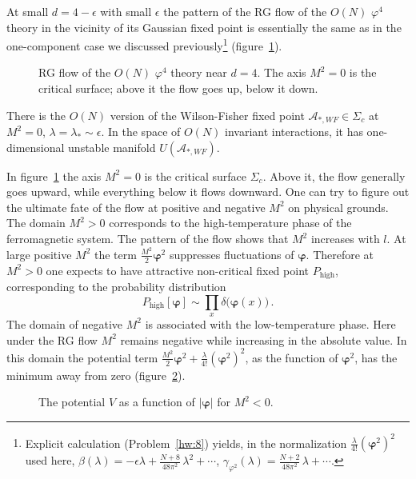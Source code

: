 At small $d=4-\epsilon$ with small $\epsilon$ the pattern of the RG flow of the
$O(N)$ $\varphi^4$ theory in the vicinity of its Gaussian fixed point is
essentially the same as in the one-component case we discussed
previously\footnote{Explicit calculation (Problem~\ref{hw:8}) yields, in the
normalization $\frac\lambda{4!}(\bm{\varphi}^2)^2$ used here,
$\beta(\lambda)=-\epsilon\lambda+\frac{N+8}{48\pi^2}\,\lambda^2+\cdots$,
$\gamma_{\varphi^2}(\lambda)=\frac{N+2}{48\pi^2}\,\lambda+\cdots$.}
(figure~\ref{fig:onflow}).
\begin{figure}[ht]
\centering{}
\caption{RG flow of the $O(N)$ $\varphi^4$ theory near $d=4$. The axis $M^2=0$ is
the critical surface; above it the flow goes up, below it down.}
\label{fig:onflow}
\end{figure}

There is the $O(N)$ version of the Wilson-Fisher fixed point
$\mathcal A_{*,WF}\in\Sigma_c$ at $M^2=0$, $\lambda=\lambda_*\sim\epsilon$. In the
space of $O(N)$ invariant interactions, it has one-dimensional unstable manifold
$U(\mathcal A_{*,WF})$.

In figure~\ref{fig:onflow} the axis $M^2=0$ is the critical surface $\Sigma_c$.
Above it, the flow generally goes upward, while everything below it flows
downward. One can try to figure out the ultimate fate of the flow at positive and
negative $M^2$ on physical grounds. The domain $M^2>0$ corresponds to the
high-temperature phase of the ferromagnetic system. The pattern of the flow shows
that $M^2$ increases with $l$. At large positive $M^2$ the term
$\frac{M^2}2\bm{\varphi}^2$ suppresses fluctuations of $\bm{\varphi}$. Therefore
at $M^2>0$ one expects to have attractive non-critical fixed point
$P_{\text{high}}$, corresponding to the probability distribution
\[
P_{\text{high}}[\bm{\varphi}]\sim\prod_x\delta\bigl(\bm{\varphi}(x)\bigr)\,.
\]
The domain of negative $M^2$ is associated with the low-temperature phase. Here
under the RG flow $M^2$ remains negative while increasing in the absolute value. In
this domain the potential term
$\frac{M^2}2\bm{\varphi}^2+\frac\lambda{4!}(\bm{\varphi}^2)^2$, as the
function of $\bm{\varphi}^2$, has the minimum away from zero
(figure~\ref{fig:mexican}).
\begin{figure}[ht]
\centering{}
\caption{The potential $V$ as a function of $|\bm{\varphi}|$ for $M^2<0$.}
\label{fig:mexican}
\end{figure}

